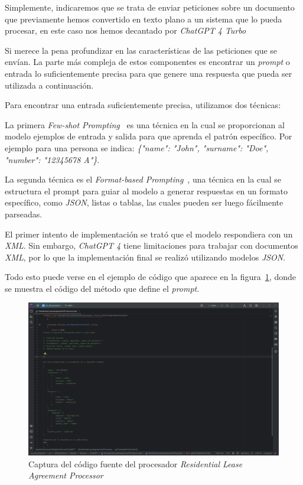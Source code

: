 Simplemente, indicaremos que se trata de enviar peticiones sobre un documento que previamente hemos convertido en texto
plano a un sistema que lo pueda procesar, en este caso nos hemos decantado por \textit{ChatGPT 4 Turbo}~
\cite{url_openai_gpt4}

Si merece la pena profundizar en las características de las peticiones que se envían.
La parte más compleja de estos componentes es encontrar un \textit{prompt} o entrada lo suficientemente precisa para que
genere una respuesta que pueda ser utilizada a continuación.

Para encontrar una entrada suficientemente precisa, utilizamos dos técnicas:

La primera \textit{Few-shot Prompting}~\cite{article_few_shot_prompting} es una técnica en la cual se proporcionan
al modelo ejemplos de entrada y salida para que aprenda el patrón específico.
Por ejemplo para una persona se indica: \textit{\{"name": "John", "surname": "Doe", "number": "12345678 A"\}}.

La segunda técnica es el \textit{Format-based Prompting}~\cite{article_format_based_prompting}, una técnica en la
cual se estructura el prompt para guiar al modelo a generar respuestas en un formato específico, como \textit{JSON},
listas o tablas, las cuales pueden ser luego fácilmente parseadas.

El primer intento de implementación se trató que el modelo respondiera con un \textit{XML}.
Sin embargo, \textit{ChatGPT 4} tiene limitaciones para trabajar con documentos \textit{XML}, por lo que la
implementación final se realizó utilizando modelos \textit{JSON}.

Todo esto puede verse en el ejemplo de código que aparece en la
figura~\ref{fig:chapter_4.4.residential_lease_agreement_processor}, donde se muestra el código del método que define el
\textit{prompt}.

\begin{figure}[ht]
    \begin{center}
        \includegraphics[width=\textwidth]{./chapter/4/images/chapter_4.4.residential_lease_agreement_processor}
        \caption{Captura del código fuente del procesador \textit{Residential Lease Agreement Processor}}
        \label{fig:chapter_4.4.residential_lease_agreement_processor}
    \end{center}
\end{figure}

